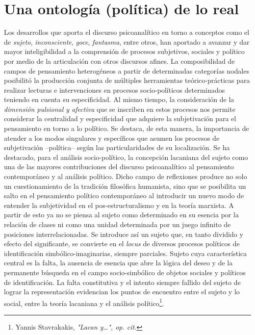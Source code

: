 \section{Una ontología (política) de lo real}

Los desarrollos que aporta el discurso psicoanalítico en torno a
conceptos como el de \emph{sujeto}, \emph{inconsciente}, \emph{goce},
\emph{fantasma}, entre otros, han aportado a avanzar y dar mayor
inteligibilidad a la comprensión de procesos subjetivos, sociales y
político por medio de la articulación con otros discursos afines. La
composibilidad de campos de pensamiento heterogéneos a partir de
determinadas categorías nodales posibilitó la producción conjunta de
múltiples herramientas teórico-prácticas para realizar lecturas e
intervenciones en procesos socio-políticos determinados teniendo en
cuenta su especificidad. Al mismo tiempo, la consideración de la
\emph{dimensión pulsional y afectiva} que se inscriben en estos procesos
nos permite considerar la centralidad y especificidad que adquiere la
subjetivación para el pensamiento en torno a lo político. Se destaca, de
esta manera, la importancia de atender a los modos singulares y
específicos que asumen los procesos de subjetivación --política-- según
las particularidades de su localización. Se ha destacado, para el
análisis socio-político, la concepción lacaniana del sujeto como una de
las mayores contribuciones del discurso psicoanalítico al pensamiento
contemporáneo y al análisis político. Dicho campo de reflexiones produce
no solo un cuestionamiento de la tradición filosófica humanista, sino
que se posibilita un salto en el pensamiento político contemporáneo al
introducir un nuevo modo de entender la subjetividad en el
pos-estructuralismo y en la teoría marxista. A partir de esto ya no se
piensa al sujeto como determinado en su esencia por la relación de
clases ni como una unidad determinada por un juego infinito de
posiciones interrelacionadas. Se introduce así un sujeto que, en tanto
dividido y efecto del significante, se convierte en el \emph{locus} de
diversos procesos políticos de identificación simbólico-imaginarias,
siempre parciales. Sujeto cuya característica central es la falta, la
ausencia de esencia que abre la lógica del deseo y de la permanente
búsqueda en el campo socio-simbólico de objetos sociales y políticos de
identificación. La falta constitutiva y el intento siempre fallido del
sujeto de lograr la representación evidencian los puntos de encuentro
entre el sujeto y lo social, entre la teoría lacaniana y el análisis
político\footnote{Yannis Stavrakakis, \emph{"Lacan y\ldots", op. cit.}}.

